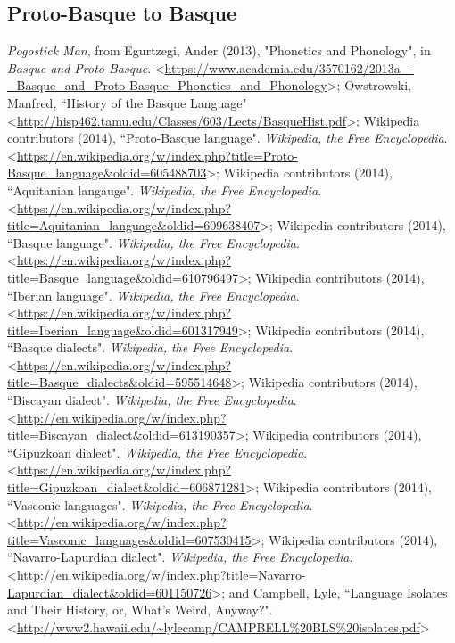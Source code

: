 \documentclass[11pt]{article}
\begin{document}
\subsection{Proto-Basque to Basque}{\it Pogostick Man}, from Egurtzegi, Ander (2013), "Phonetics and Phonology", in {\it Basque and Proto-Basque}. \textless\url{https://www.academia.edu/3570162/2013a_-_Basque_and_Proto-Basque_Phonetics_and_Phonology}\textgreater; Owstrowski, Manfred, ``History of the Basque Language" \textless\url{http://hisp462.tamu.edu/Classes/603/Lects/BasqueHist.pdf}\textgreater; Wikipedia contributors (2014), ``Proto-Basque language". {\it Wikipedia, the Free Encyclopedia}. \textless\url{https://en.wikipedia.org/w/index.php?title=Proto-Basque_language&oldid=605488703}\textgreater; Wikipedia contributors (2014), ``Aquitanian langauge". {\it Wikipedia, the Free Encyclopedia}. \textless\url{https://en.wikipedia.org/w/index.php?title=Aquitanian_language&oldid=609638407}\textgreater; Wikipedia contributors (2014), ``Basque language". {\it Wikipedia, the Free Encyclopedia}. \textless\url{https://en.wikipedia.org/w/index.php?title=Basque_language&oldid=610796497}\textgreater; Wikipedia contributors (2014), ``Iberian language". {\it Wikipedia, the Free Encyclopedia}. \textless\url{https://en.wikipedia.org/w/index.php?title=Iberian_language&oldid=601317949}\textgreater; Wikipedia contributors (2014), ``Basque dialects". {\it Wikipedia, the Free Encyclopedia}. \textless\url{https://en.wikipedia.org/w/index.php?title=Basque_dialects&oldid=595514648}\textgreater; Wikipedia contributors (2014), ``Biscayan dialect". {\it Wikipedia, the Free Encyclopedia}. \textless\url{http://en.wikipedia.org/w/index.php?title=Biscayan_dialect&oldid=613190357}\textgreater; Wikipedia contributors (2014), ``Gipuzkoan dialect". {\it Wikipedia, the Free Encyclopedia}. \textless\url{https://en.wikipedia.org/w/index.php?title=Gipuzkoan_dialect&oldid=606871281}\textgreater; Wikipedia contributors (2014), ``Vasconic languages". {\it Wikipedia, the Free Encyclopedia}. \textless\url{http://en.wikipedia.org/w/index.php?title=Vasconic_languages&oldid=607530415}\textgreater; Wikipedia contributors (2014), ``Navarro-Lapurdian dialect". {\it Wikipedia, the Free Encyclopedia}. \textless\url{http://en.wikipedia.org/w/index.php?title=Navarro-Lapurdian_dialect&oldid=601150726}\textgreater; and Campbell, Lyle, ``Language Isolates and Their History, or, What's Weird, Anyway?". \textless\url{http://www2.hawaii.edu/~lylecamp/CAMPBELL%20BLS%20isolates.pdf}\textgreater
\end{document}

